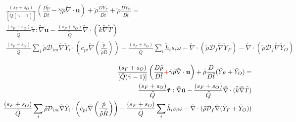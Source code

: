 \documentclass[preprint,12pt,authoryear]{elsarticle}
\begin{document}
\begin{equation}
\begin{split}
	\frac{(s_F+s_O)}{[\tilde{Q}(\tilde{\gamma}-1)]}
	\left(
        	\frac{D \tilde{p}}{D\tilde{t}}
		-
		\tilde{\gamma}
		\tilde{p} 
		\tilde{\nabla}\cdot{\mathbf{u}}
	\right)
	+
	\tilde{\rho} \frac{D  \tilde{Y}_F }{D \tilde{t}}
	+
	\tilde{\rho} \frac{D  \tilde{Y}_O }{D \tilde{t}}
        =
	\\
	\frac{(s_F+s_O)}{\tilde{Q}}
        \pmb{\tilde{\tau}}:\tilde{\nabla} \tilde{\mathbf{u}} 
        - 
	\frac{(s_F+s_O)}{\tilde{Q}}
        \tilde{\nabla} \cdot (\tilde{k}\tilde{\nabla} \tilde{T})
	\\
	\frac{(s_F+s_O)}{\tilde{Q}}
        \sum\limits_i 
        \tilde{\rho}
        \mathcal{D}_{im}
        \tilde{\nabla}
        \tilde{Y}_i     
        \cdot
        \left(
                c_{pi}
                \tilde{\nabla}
                \left(
                	\frac{\tilde{p}}{\tilde{\rho}\tilde{R}}
                \right)
        \right)
	-
	\frac{(s_F+s_O)}{\tilde{Q}}
        \sum\limits_i
	\tilde{h}_i
        s_i \omega	
	-
	\tilde{\nabla}\cdot( \tilde{\rho} \mathcal{D}_f\tilde{\nabla} \tilde{Y}_F)
	-
	\tilde{\nabla}\cdot( \tilde{\rho} \mathcal{D}_f\tilde{\nabla} \tilde{Y}_O)
\end{split}
\end{equation}

\begin{equation}
\begin{split}
	\frac{(s_F+s_O)}{[\tilde{Q}(\tilde{\gamma}-1)]}
	\left(
        	\frac{D \tilde{p}}{D\tilde{t}}
		\textcolor{red}{+}
		\tilde{\gamma}
		\tilde{p} 
		\tilde{\nabla}\cdot{\mathbf{u}}
	\right)
	+
	\tilde{\rho} \frac{D  }{D \tilde{t}}(\tilde{Y}_F+\tilde{Y}_O)
        =
	\\
	\frac{(s_F+s_O)}{\tilde{Q}}
        \pmb{\tilde{\tau}}:\tilde{\nabla} \tilde{\mathbf{u}} 
        - 
	\frac{(s_F+s_O)}{\tilde{Q}}
        \tilde{\nabla} \cdot (\tilde{k}\tilde{\nabla} \tilde{T})
	\\
	\frac{(s_F+s_O)}{\tilde{Q}}
        \sum\limits_i 
        \tilde{\rho}
        \mathcal{D}_{im}
        \tilde{\nabla}
        \tilde{Y}_i     
        \cdot
        \left(
                c_{pi}
                \tilde{\nabla}
                \left(
                	\frac{\tilde{p}}{\tilde{\rho}\tilde{R}}
                \right)
        \right)
	-
	\frac{(s_F+s_O)}{\tilde{Q}}
        \sum\limits_i
	\tilde{h}_i
        s_i \omega	
	-
	\tilde{\nabla}\cdot( \tilde{\rho} \mathcal{D}_f\tilde{\nabla} (\tilde{Y}_F+\tilde{Y}_O))
\end{split}
\end{equation}
\end{document}
